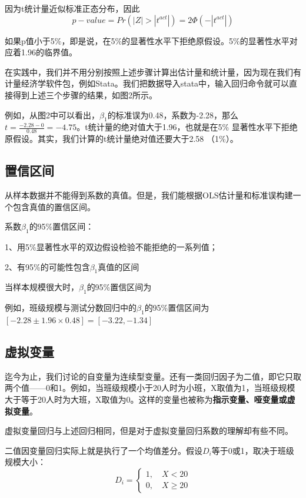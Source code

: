 \documentclass[cn,12pt,math=newtx,citestyle=gb7714-2015,bibstyle=gb7714-2015]{elegantbook}
\begin{document}
	因为t统计量近似标准正态分布，因此
	\begin{equation}
		p-value=Pr(|Z|>|t^{act}|)=2\Phi(-|t^{act}|)
	\end{equation}
	
	如果p值小于5\%，即是说，在5\%的显著性水平下拒绝原假设。5\%的显著性水平对应着1.96的临界值。
	
	在实践中，我们并不用分别按照上述步骤计算出估计量和统计量，因为现在我们有计量经济学软件包，例如Stata。我们把数据导入stata中，输入回归命令就可以直接得到上述三个步骤的结果，如图2所示。
	
	例如，从图2中可以看出，$\beta_1$的标准误为0.48，系数为-2.28，那么$t=\frac{-2.28-0}{0.48}=-4.75$。t统计量的绝对值大于1.96，也就是在5\% 显著性水平下拒绝原假设。其实，我们计算的t统计量绝对值还要大于2.58 （1\%）。
	
	\subsection{置信区间}
	从样本数据并不能得到系数的真值。但是，我们能根据OLS估计量和标准误构建一个包含真值的置信区间。
	
	系数$\beta_1$的95\%置信区间：
	
	1、用5\%显著性水平的双边假设检验不能拒绝的一系列值；
	
	2、有95\%的可能性包含$\beta_1$真值的区间
	
	当样本规模很大时，$\beta_1$的95\%置信区间为
	\begin{equation}
		[\hat{\beta}_1-1.96SE(\hat{\beta}_1),\hat{\beta}_1+1.96SE(\hat{\beta}_1)]
	\end{equation}
	
	例如，班级规模与测试分数回归中的$\beta_1$的95\%置信区间为$[-2.28\pm1.96\times0.48]=[-3.22,-1.34]$
	
	\subsection{虚拟变量}
	迄今为止，我们讨论的自变量为连续型变量。还有一类回归因子为二值，即它只取两个值——0和1。例如，当班级规模小于20人时为小班，X取值为1，当班级规模大于等于20人时为大班，X取值为0。这样的变量也被称为\textbf{指示变量、哑变量或虚拟变量}。
	
	虚拟变量回归与上述回归相同，但是对于虚拟变量回归系数的理解却有些不同。
	
	二值因变量回归实际上就是执行了一个均值差分。假设$D_i$等于0或1，取决于班级规模大小：
	\[ D_i=\begin{cases}
		1,\quad X<20 \\
		0,\quad X\geq20
	\end{cases} \]
	
\end{document}
